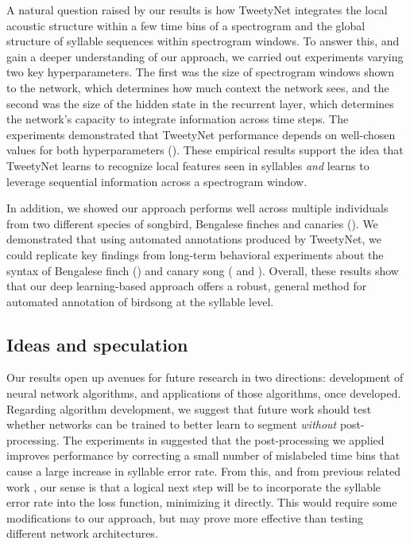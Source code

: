 \documentclass[9pt,lineno]{elife}
\begin{document}
A natural question raised by our results is how TweetyNet 
integrates the local acoustic structure within a few time bins of a spectrogram  
and the global structure of syllable sequences within spectrogram windows. 
To answer this, and gain a deeper understanding of our approach, 
we carried out experiments varying two key hyperparameters. 
The first was the size of spectrogram windows shown to the network, 
which determines how much context the network sees, 
and the second was the size of the hidden state in the recurrent layer, 
which determines the network's capacity to integrate information across time steps.
The experiments demonstrated that TweetyNet performance depends on well-chosen values for both hyperparameters ().
These empirical results support the idea that TweetyNet 
learns to recognize local features seen in syllables  
\textit{and} learns to leverage sequential information across a spectrogram window. 

In addition, we showed our approach performs well across multiple individuals from 
two different species of songbird, Bengalese finches and canaries (). 
We demonstrated that using automated annotations produced by TweetyNet, 
we could replicate key findings from long-term behavioral experiments 
about the syntax of Bengalese finch () 
and canary song ( and ).
Overall, these results show that our deep learning-based approach 
offers a robust, general method for automated annotation of birdsong at the syllable level. 

\subsection{Ideas and speculation}
Our results open up avenues for future research in two directions: 
development of neural network algorithms, 
and applications of those algorithms, once developed.
Regarding algorithm development, 
we suggest that future work should test whether networks can be trained 
to better learn to segment \textit{without} post-processing. 
The experiments in  suggested 
that the post-processing we applied 
improves performance by correcting a small number of mislabeled time bins 
that cause a large increase in syllable error rate. 
From this, and from previous related work \citep{lea2017temporal}, 
our sense is that a logical next step will be to incorporate the syllable error rate 
into the loss function, minimizing it directly. 
This would require some modifications to our approach,  
but may prove more effective than testing different network architectures.
\end{document}

